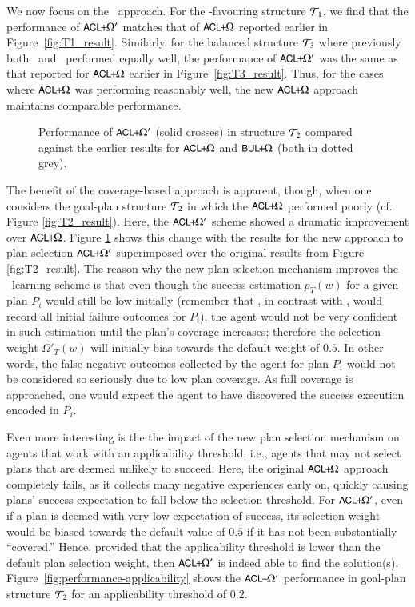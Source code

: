 We now focus on the \CL\ approach.
For the \CL-favouring structure ${\mathcal{T}}_1$, we find that the performance of $\mbox{$\textsf{\small ACL}\!\!+\!\!\Omega'$}$ matches that
of $\mbox{$\textsf{\small ACL}\!\!+\!\!\Omega$}$ reported earlier in Figure~\ref{fig:T1_result}.
Similarly, for the balanced structure ${\mathcal{T}}_3$ where previously both \CL\ and
\BUL\ performed equally well, the performance of $\mbox{$\textsf{\small ACL}\!\!+\!\!\Omega'$}$
was the same as that reported for $\mbox{$\textsf{\small ACL}\!\!+\!\!\Omega$}$ earlier in Figure~\ref{fig:T3_result}.
Thus, for the cases where $\mbox{$\textsf{\small ACL}\!\!+\!\!\Omega$}$ was performing reasonably well, the new $\mbox{$\textsf{\small ACL}\!\!+\!\!\Omega$}$ approach maintains comparable performance.

\begin{figure}[t]
\begin{center}

\caption{Performance of $\mbox{$\textsf{\small ACL}\!\!+\!\!\Omega'$}$ (solid crosses) in structure ${\mathcal{T}}_2$ compared against
the earlier results for $\mbox{$\textsf{\small ACL}\!\!+\!\!\Omega$}$ and $\mbox{$\textsf{\small BUL}\!\!+\!\!\Omega$}$ (both in dotted grey).}
\label{fig:T2_result2}
\end{center}
\end{figure}

The benefit of the coverage-based approach is apparent, though, when one
considers the goal-plan structure ${\mathcal{T}}_2$ in which the $\mbox{$\textsf{\small ACL}\!\!+\!\!\Omega$}$ performed
poorly (cf. Figure \ref{fig:T2_result}).
Here, the $\mbox{$\textsf{\small ACL}\!\!+\!\!\Omega'$}$ scheme showed a dramatic improvement over $\mbox{$\textsf{\small ACL}\!\!+\!\!\Omega$}$. Figure
\ref{fig:T2_result2} shows this change with the results for the new approach to
plan selection $\mbox{$\textsf{\small ACL}\!\!+\!\!\Omega'$}$ superimposed over the original results
from Figure \ref{fig:T2_result}.
The reason why the new plan selection mechanism improves the \CL\ learning scheme
is that even though the success estimation $p_T(w)$ for a given plan $P_i$ would
still be low initially (remember that \CL, in contrast with \BUL, would record
all initial failure outcomes for $P_i$), the agent would not be very confident in
such estimation until the plan's coverage increases; therefore the
selection weight $\Omega'_T(w)$ will initially bias towards the default weight of
$0.5$. In other words, the false negative outcomes collected by the agent for
plan $P_i$ would not be considered so seriously due to low plan coverage. As full
coverage is approached, one would expect the agent to have discovered the success
execution encoded in $P_i$.


Even more interesting is the the impact of the new plan selection mechanism on
agents that work with an applicability threshold, i.e., agents that may not
select plans that are deemed unlikely to succeed.
Here, the original $\mbox{$\textsf{\small ACL}\!\!+\!\!\Omega$}$ approach completely fails, as it collects many
negative experiences early on, quickly causing plans' success expectation to fall
below the selection threshold. For $\mbox{$\textsf{\small ACL}\!\!+\!\!\Omega'$}$, even if a plan is deemed with very
low expectation of success, its selection weight would be biased towards the
default value of $0.5$ if it has not been substantially ``covered.''
Hence, provided that the applicability threshold is lower than the default plan
selection weight, then $\mbox{$\textsf{\small ACL}\!\!+\!\!\Omega'$}$ is indeed able to find the solution(s).
Figure~\ref{fig:performance-applicability} shows the $\mbox{$\textsf{\small ACL}\!\!+\!\!\Omega'$}$ performance in
goal-plan structure ${\mathcal{T}}_2$ for an applicability threshold of $0.2$.


